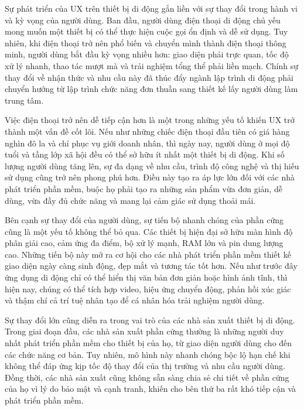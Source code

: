         \vspace{0.5em}
    
      \hspace*{0.8cm}Sự phát triển của UX trên thiết bị di động gắn liền với sự thay đổi trong hành vi và kỳ vọng của người dùng. Ban đầu, người dùng điện thoại di động chủ yếu mong muốn một thiết bị có thể thực hiện cuộc gọi ổn định và dễ sử dụng. Tuy nhiên, khi điện thoại trở nên phổ biến và chuyển mình thành điện thoại thông minh, người dùng bắt đầu kỳ vọng nhiều hơn: giao diện phải trực quan, tốc độ xử lý nhanh, thao tác mượt mà và trải nghiệm tổng thể phải liền mạch. Chính sự thay đổi về nhận thức và nhu cầu này đã thúc đẩy ngành lập trình di động phải chuyển hướng từ lập trình chức năng đơn thuần sang thiết kế lấy người dùng làm trung tâm.
    
      \vspace{0.5em}
    
      \hspace*{0.8cm}Việc điện thoại trở nên dễ tiếp cận hơn là một trong những yếu tố khiến UX trở thành một vấn đề cốt lõi. Nếu như những chiếc điện thoại đầu tiên có giá hàng nghìn đô la và chỉ phục vụ giới doanh nhân, thì ngày nay, người dùng ở mọi độ tuổi và tầng lớp xã hội đều có thể sở hữu ít nhất một thiết bị di động. Khi số lượng người dùng tăng lên, sự đa dạng về nhu cầu, trình độ công nghệ và thị hiếu sử dụng cũng trở nên phong phú hơn. Điều này tạo ra áp lực lớn đối với các nhà phát triển phần mềm, buộc họ phải tạo ra những sản phẩm vừa đơn giản, dễ dùng, vừa đầy đủ chức năng và mang lại cảm giác sử dụng thoải mái.
  
      \vspace{0.5em}
  
    \hspace*{0.8cm}Bên cạnh sự thay đổi của người dùng, sự tiến bộ nhanh chóng của phần cứng cũng là một yếu tố không thể bỏ qua. Các thiết bị hiện đại sở hữu màn hình độ phân giải cao, cảm ứng đa điểm, bộ xử lý mạnh, RAM lớn và pin dung lượng cao. Những tiến bộ này mở ra cơ hội cho các nhà phát triển phần mềm thiết kế giao diện ngày càng sinh động, đẹp mắt và tương tác tốt hơn. Nếu như trước đây ứng dụng di động chỉ có thể hiển thị văn bản đơn giản hoặc hình ảnh tĩnh, thì hiện nay, chúng có thể tích hợp video, hiệu ứng chuyển động, phản hồi xúc giác và thậm chí cả trí tuệ nhân tạo để cá nhân hóa trải nghiệm người dùng.
  
    \vspace{0.5em}
  
    \hspace*{0.8cm}Sự thay đổi lớn cũng diễn ra trong vai trò của các nhà sản xuất thiết bị di động. Trong giai đoạn đầu, các nhà sản xuất phần cứng thường là những người duy nhất phát triển phần mềm cho thiết bị của họ, từ giao diện người dùng cho đến các chức năng cơ bản. Tuy nhiên, mô hình này nhanh chóng bộc lộ hạn chế khi không thể đáp ứng kịp tốc độ thay đổi của thị trường và nhu cầu người dùng. Đồng thời, các nhà sản xuất cũng không sẵn sàng chia sẻ chi tiết về phần cứng của họ vì lý do bảo mật và cạnh tranh, khiến cho bên thứ ba rất khó tiếp cận và phát triển phần mềm.
  
